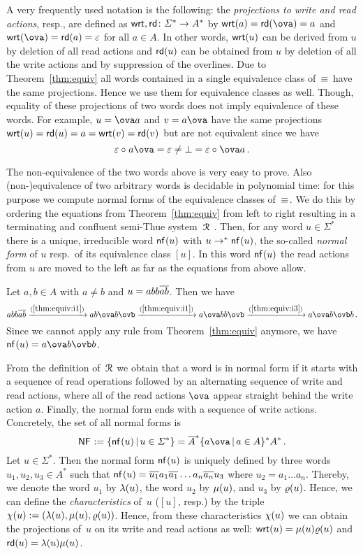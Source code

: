 A very frequently used notation is the following: the \emph{projections to write and read actions}, resp., are defined as $\mathsf{wrt},\mathsf{rd}\colon\varSigma^*\to A^*$ by $\wrt{a}=\rd{\ova}=a$ and $\wrt{\ova}=\rd{a}=\varepsilon$ for all $a\in A$. In other words, $\mathsf{wrt}(u)$ can be derived from $u$ by deletion of all read actions and $\mathsf{rd}(u)$ can be obtained from $u$ by deletion of all the write actions and by suppression of the overlines. Due to Theorem~\ref{thm:equiv} all words contained in a single equivalence class of~$\equiv_{}$ have the same projections. Hence we use them for equivalence classes as well. Though, equality of these projections of two words does not imply equivalence of these words. For example, $u=\ova a$ and $v=a\ova$ have the same projections $\mathsf{wrt}(u)=\mathsf{rd}(u)=a=\mathsf{wrt}(v)=\mathsf{rd}(v)$ but are not equivalent since we have
\[\varepsilon\opx a\ova=\varepsilon\neq\bot=\varepsilon\opx\ova a\,.\]

The non-equivalence of the two words above is very easy to prove. Also (non-)equivalence of two arbitrary words is decidable in polynomial time: for this purpose we compute normal forms of the equivalence classes of~$\equiv_{}$. We do this by ordering the equations from Theorem~\ref{thm:equiv} from left to right resulting in a terminating and confluent semi-Thue system~$\mathcal{R}_{}$ \cite[Lemma~4.1]{HusKZ17}. Then, for any word $u\in\varSigma^*$ there is a unique, irreducible word $\mathsf{nf}_{}(u)$ with $u\to^*\mathsf{nf}_{}(u)$, the so-called \emph{normal form} of $u$ resp.\ of its equivalence class $[u]$. In this word $\mathsf{nf}_{}(u)$ the read actions from $u$ are moved to the left as far as the equations from above allow.

\begin{example}\label{ex:nfx}
	Let $a,b\in A$ with $a\neq b$ and $u=abb\overline{ab}$. Then we have
	\[
	abb\ov{ab}\xrightarrow{(\ref{thm:equiv:i1})} ab\ova b\ovb\xrightarrow{(\ref{thm:equiv:i1})} a\ova bb\ovb\xrightarrow{(\ref{thm:equiv:i3})} a\ova b\ovb b\,.
	\]
	Since we cannot apply any rule from Theorem~\ref{thm:equiv} anymore, we have $\nfx{u}=a\ova b\ovb b$.
\end{example}

From the definition of~$\mathcal{R}_{}$ we obtain that a word is in normal form if it starts with a sequence of read operations followed by an alternating sequence of write and read actions, where all of the read actions $\ova$ appear straight behind the write action $a$. Finally, the normal form ends with a sequence of write actions. Concretely, the set of all normal forms is
\[\NFx:=\{\nfx{u}\,|\,u\in\varSigma^*\}=\ov{A}^*\{a\ova\,|\,a\in A\}^*A^*\,.\]
Let $u\in\varSigma^*$. Then the normal form $\mathsf{nf}_{}(u)$ is uniquely defined by three words $u_1,u_2,u_3\in A^*$ such that $\mathsf{nf}_{}(u)=\overline{u_1}a_1\overline{a_1}\dots a_n\overline{a_n}u_3$ where $u_2=a_1\dots a_n$. Thereby, we denote the word $u_1$ by $\lambda(u)$, the word $u_2$ by $\mu(u)$, and $u_3$ by $\varrho(u)$. Hence, we can define the \emph{characteristics} of~$u$ ($[u]$, resp.) by the triple 
$\chi(u):=(\lambda(u),\mu(u),\varrho(u))$.
Hence, from these characteristics $\chi(u)$ we can obtain the projections of~$u$ on its write and read actions as well: $\mathsf{wrt}(u)=\mu(u)\varrho(u)$ and $\mathsf{rd}(u)=\lambda(u)\mu(u)$.

